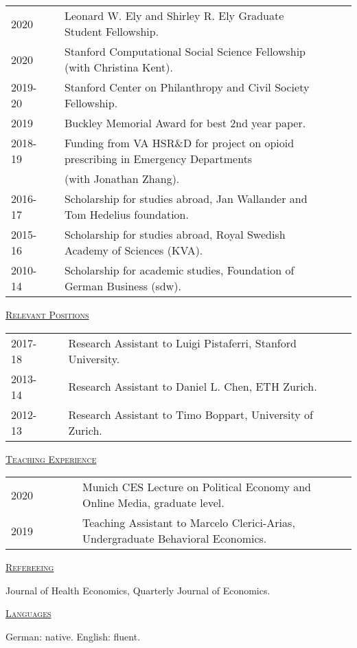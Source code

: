 \documentclass[letterpaper,11pt]{article}
\begin{document}
\begin{tabular}{@{}l@{}cl@{}cl}
2020 & & Leonard W. Ely and Shirley R. Ely Graduate Student Fellowship. \\
2020 & & Stanford Computational Social Science Fellowship (with Christina Kent). \\
2019-20 & & Stanford Center on Philanthropy and Civil Society Fellowship. \\
2019 & & Buckley Memorial Award for best 2nd year paper. \\
2018-19 & & Funding from VA HSR\&D for project on opioid prescribing in Emergency Departments \\ & & (with Jonathan Zhang). \\
2016-17 & & Scholarship for studies abroad, Jan Wallander and Tom Hedelius foundation. \\
2015-16 & & Scholarship for studies abroad, Royal Swedish Academy of Sciences (KVA).  \\
2010-14 & & Scholarship for academic studies, Foundation of German Business (sdw).
\end{tabular}
 
 \bigskip
 
\underline {\textsc{Relevant Positions}}

\begin{tabular}{@{}l@{}cl@{}cl}
2017-18 & & Research Assistant to Luigi Pistaferri, Stanford University. \\
2013-14 & & Research Assistant to Daniel L. Chen, ETH Zurich. \\
2012-13 & & Research Assistant to Timo Boppart, University of Zurich.
\end{tabular}

\bigskip
 
\underline {\textsc{Teaching Experience}}

\begin{tabular}{@{}l@{}cl@{}cl}
2020 & \ \ \ \ \ & Munich CES Lecture on Political Economy and Online Media, graduate level. \\
2019 & \ \ \ \ \ & Teaching Assistant to Marcelo Clerici-Arias, Undergraduate Behavioral Economics.
\end{tabular}

\bigskip
 
\underline {\textsc{Refereeing}}

Journal of Health Economics, Quarterly Journal of Economics.

\bigskip
 
\underline {\textsc{Languages}}

German: native. English: fluent.
\end{document}
